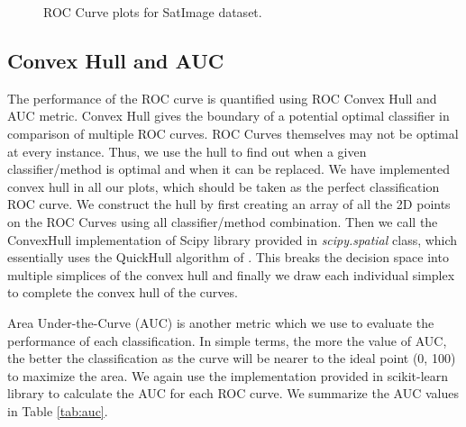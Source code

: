 \documentclass[10pt,journal,compsoc]{IEEEtran}
\begin{document}
\begin{figure}[!b]
\centering
{}
\hfil
{}
\hfil
\caption{ROC Curve plots for SatImage dataset.}
\label{fig:sat}
\end{figure}



\subsection{Convex Hull and AUC}

The performance of the ROC curve is quantified using ROC Convex Hull and AUC metric.
Convex Hull gives the boundary of a potential optimal classifier in comparison of multiple ROC curves.
ROC Curves themselves may not be optimal at every instance. 
Thus, we use the hull to find out when a given classifier/method is optimal and when it can be replaced.
We have implemented convex hull in all our plots, which should be taken as the perfect classification ROC curve.
We construct the hull by first creating an array of all the 2D points on the ROC Curves using all classifier/method combination.
Then we call the ConvexHull implementation of Scipy library \cite{scipy} provided in \textit{scipy.spatial} class, which essentially uses the QuickHull algorithm of \cite{qhull}\cite{pf01}.
This breaks the decision space into multiple simplices of the convex hull and finally we draw each individual simplex to complete the convex hull of the curves.

Area Under-the-Curve (AUC) is another metric which we use to evaluate the performance of each classification.
In simple terms, the more the value of AUC, the better the classification as the curve will be nearer to the ideal point (0, 100) to maximize the area.
We again use the implementation provided in scikit-learn library to calculate the AUC for each ROC curve.
We summarize the AUC values in Table \ref{tab:auc}.
\end{document}
